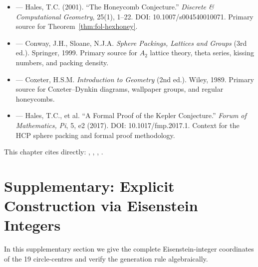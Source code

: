 \begin{itemize}
\item \cite{hales_honeycomb} — Hales, T.C. (2001).
      ``The Honeycomb Conjecture.''
      \emph{Discrete \& Computational Geometry}, 25(1), 1--22.
      DOI: 10.1007/s004540010071.
      Primary source for Theorem~\ref{thm:fol-hexhoney}.

\item \cite{conway_sphere_packings} — Conway, J.H., Sloane, N.J.A.
      \emph{Sphere Packings, Lattices and Groups} (3rd ed.).
      Springer, 1999.
      Primary source for \(A_2\) lattice theory, theta series, kissing
      numbers, and packing density.

\item \cite{coxeter_intro_geometry} — Coxeter, H.S.M.
      \emph{Introduction to Geometry} (2nd ed.).
      Wiley, 1989.
      Primary source for Coxeter--Dynkin diagrams, wallpaper groups,
      and regular honeycombs.

\item \cite{hales_flyspeck} — Hales, T.C., et al.
      ``A Formal Proof of the Kepler Conjecture.''
      \emph{Forum of Mathematics, Pi}, 5, e2 (2017).
      DOI: 10.1017/fmp.2017.1.
      Context for the HCP sphere packing and formal proof methodology.
\end{itemize}

This chapter cites directly: \cite{hales_honeycomb},
\cite{conway_sphere_packings}, \cite{coxeter_intro_geometry},
\cite{hales_flyspeck}.


\section{Supplementary: Explicit Construction via Eisenstein Integers}
\label{sec:fol-eisenstein}

In this supplementary section we give the complete Eisenstein-integer
coordinates of the 19 circle-centres and verify the generation rule
algebraically.

